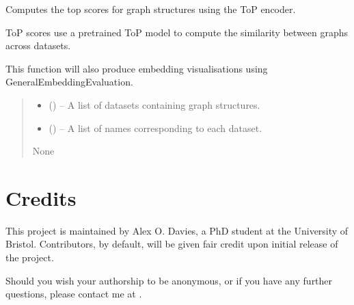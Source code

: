 \documentclass[letterpaper,10pt,english]{sphinxhowto}
\begin{document}

\begin{fulllineitems}
\label{\detokenize{top:top.compute_top_scores}}
\pysigstartsignatures
{}
\pysigstopsignatures
\sphinxAtStartPar
Computes the top scores for graph structures using the ToP encoder.

\sphinxAtStartPar
ToP scores use a pre\sphinxhyphen{}trained ToP model to compute the similarity between graphs across datasets.

\sphinxAtStartPar
This function will also produce embedding visualisations using GeneralEmbeddingEvaluation.
\begin{quote}\begin{description}
\begin{itemize}
\item {} 
\sphinxAtStartPar
{} () – A list of datasets containing graph structures.

\item {} 
\sphinxAtStartPar
{} () – A list of names corresponding to each dataset.

\end{itemize}

\sphinxAtStartPar
None

\end{description}\end{quote}

\end{fulllineitems}



\section{Credits}
\label{\detokenize{index:credits}}
\sphinxAtStartPar
This project is maintained by Alex O. Davies, a PhD student at the University of Bristol.
Contributors, by default, will be given fair credit upon initial release of the project.

\sphinxAtStartPar
Should you wish your authorship to be anonymous, or if you have any further questions, please contact me at .
\end{document}
